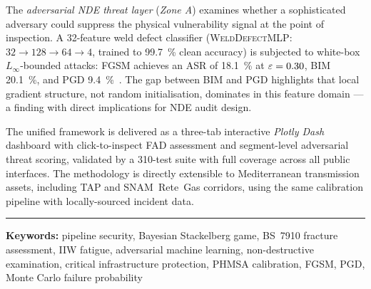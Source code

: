 The \emph{adversarial NDE threat layer} (\emph{Zone A}) examines whether
a sophisticated adversary could suppress the physical vulnerability signal
at the point of inspection.  A \num{32}-feature weld defect classifier
(\textsc{WeldDefectMLP}: $32{\to}128{\to}64{\to}4$, trained to
\SI{99.7}{\percent} clean accuracy) is subjected to white-box
$L_\infty$-bounded attacks: \ac{FGSM} achieves an \ac{ASR} of
\SI{18.1}{\percent} at $\varepsilon = 0.30$, \ac{BIM} \SI{20.1}{\percent},
and \ac{PGD} \SI{9.4}{\percent}~\cite{Goodfellow2015,Kurakin2017,Madry2018}.
The gap between BIM and PGD highlights that local gradient structure, not
random initialisation, dominates in this feature domain — a finding with
direct implications for NDE audit design.

The unified framework is delivered as a three-tab interactive \emph{Plotly
Dash} dashboard with click-to-inspect FAD assessment and segment-level
adversarial threat scoring, validated by a 310-test suite with full
coverage across all public interfaces.  The methodology is directly
extensible to Mediterranean transmission assets, including TAP and
SNAM~Rete~Gas corridors, using the same calibration pipeline with
locally-sourced incident data.

\vspace{0.6em}
\noindent\rule{\textwidth}{0.4pt}

\vspace{0.5em}
\noindent\textbf{Keywords:}
pipeline security, Bayesian Stackelberg game, BS~7910 fracture assessment,
IIW fatigue, adversarial machine learning, non-destructive examination,
critical infrastructure protection, PHMSA calibration, FGSM, PGD,
Monte Carlo failure probability
